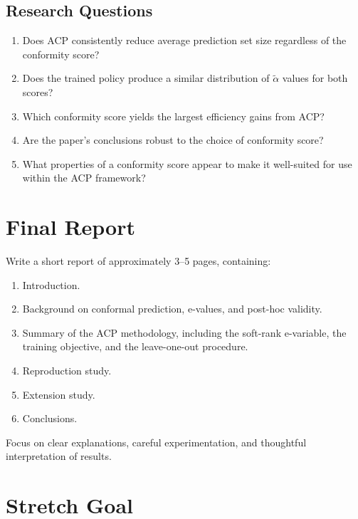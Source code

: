 \documentclass[11pt]{article}
\begin{document}
\subsection{Research Questions}

\begin{enumerate}[label=\arabic*.]
  \item Does ACP consistently reduce average prediction set size regardless
  of the conformity score?
  \item Does the trained policy produce a similar distribution of
  $\tilde\alpha$ values for both scores?
  \item Which conformity score yields the largest efficiency gains from ACP?
  \item Are the paper's conclusions robust to the choice of conformity score?
  \item What properties of a conformity score appear to make it well-suited
  for use within the ACP framework?
\end{enumerate}

\section{Final Report}

Write a short report of approximately 3--5 pages, containing:

\begin{enumerate}[label=\arabic*.]
  \item Introduction.
  \item Background on conformal prediction, e-values, and post-hoc validity.
  \item Summary of the ACP methodology, including the soft-rank e-variable,
  the training objective, and the leave-one-out procedure.
  \item Reproduction study.
  \item Extension study.
  \item Conclusions.
\end{enumerate}

Focus on clear explanations, careful experimentation, and thoughtful
interpretation of results.

\section{Stretch Goal}
\end{document}
